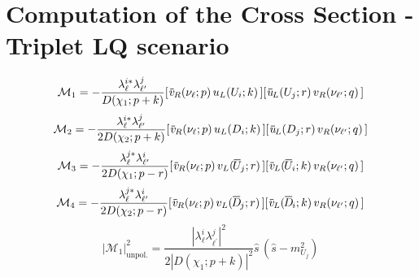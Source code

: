\documentclass[aps,preprint,tightenlines,floatfix,superscriptaddress,nofootinbib,showpacs]{revtex4-1}
\def\beq{\begin{equation}}
\def\eeq{\end{equation}}
\newcommand*\xbar[1]{%
  \hbox{%
    \vbox{%
      \hrule height 0.5pt %
      \kern0.3ex%
      \hbox{%
        \kern-0.1em%
        \ensuremath{#1}%
        \kern-0.1em%
      }%
    }%
  }%
}
\begin{document}
\section{Computation of the Cross Section - Triplet LQ scenario}
\beq
\mathcal{M}_1=-\frac{\lambda^{i*}_{\ell}\lambda^j_{\ell^{\prime}}}{D(\chi_1;p+k)}[\,\xbar{v}_R(\nu_{\ell};p)\,u_L(U_i;k)\,][\,\xbar{u}_L(U_j;r)\,v_R(\nu_{\ell^{\prime}};q)\,]
\eeq
\beq
\mathcal{M}_2=-\frac{\lambda^{i*}_{\ell}\lambda^j_{\ell^{\prime}}}{2 D(\chi_2;p+k)}[\,\xbar{v}_R(\nu_{\ell};p)\,u_L(D_i;k)\,][\,\xbar{u}_L(D_j;r)\,v_R(\nu_{\ell^{\prime}};q)\,]
\eeq
\beq
\mathcal{M}_3=-\frac{\lambda^{j*}_{\ell}\lambda^i_{\ell^{\prime}}}{2 D(\chi_1;p-r)}[\,\xbar{v}_R(\nu_{\ell};p)\,v_L(\xbar{U}_j;r)\,][\,\xbar{v}_L(\xbar{U}_i;k)\,v_R(\nu_{\ell^{\prime}};q)\,]
\eeq
\beq
\mathcal{M}_4=-\frac{\lambda^{j*}_{\ell}\lambda^i_{\ell^{\prime}}}{2 D(\chi_2;p-r)}[\,\xbar{v}_R(\nu_{\ell};p)\,v_L(\xbar{D}_j;r)\,][\,\xbar{v}_L(\xbar{D}_i;k)\,v_R(\nu_{\ell^{\prime}};q)\,]
\eeq
\beq
|\mathcal{M}_1|^2_{\mathrm{unpol.}}=\frac{|\lambda^{i}_{\ell}\lambda^j_{\ell^{\prime}}|^2}{2|D(\chi_1;p+k)|^2}\hat{s}\,(\hat{s}-m^2_{U_j}) 
\eeq
\appendix
\end{document}
